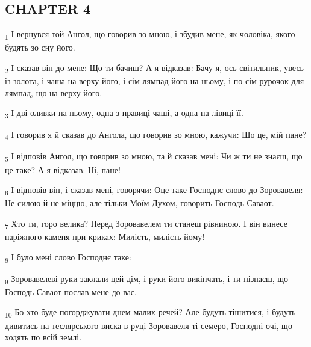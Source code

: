 \subsection{CHAPTER 4}
\begin{tcolorbox}
\textsubscript{1} І вернувся той Ангол, що говорив зо мною, і збудив мене, як чоловіка, якого будять зо сну його.
\end{tcolorbox}
\begin{tcolorbox}
\textsubscript{2} І сказав він до мене: Що ти бачиш? А я відказав: Бачу я, ось світильник, увесь із золота, і чаша на верху його, і сім лямпад його на ньому, і по сім рурочок для лямпад, що на верху його.
\end{tcolorbox}
\begin{tcolorbox}
\textsubscript{3} І дві оливки на ньому, одна з правиці чаші, а одна на лівиці її.
\end{tcolorbox}
\begin{tcolorbox}
\textsubscript{4} І говорив я й сказав до Ангола, що говорив зо мною, кажучи: Що це, мій пане?
\end{tcolorbox}
\begin{tcolorbox}
\textsubscript{5} І відповів Ангол, що говорив зо мною, та й сказав мені: Чи ж ти не знаєш, що це таке? А я відказав: Ні, пане!
\end{tcolorbox}
\begin{tcolorbox}
\textsubscript{6} І відповів він, і сказав мені, говорячи: Оце таке Господнє слово до Зоровавеля: Не силою й не міццю, але тільки Моїм Духом, говорить Господь Саваот.
\end{tcolorbox}
\begin{tcolorbox}
\textsubscript{7} Хто ти, горо велика? Перед Зоровавелем ти станеш рівниною. І він винесе наріжного каменя при криках: Милість, милість йому!
\end{tcolorbox}
\begin{tcolorbox}
\textsubscript{8} І було мені слово Господнє таке:
\end{tcolorbox}
\begin{tcolorbox}
\textsubscript{9} Зоровавелеві руки заклали цей дім, і руки його викінчать, і ти пізнаєш, що Господь Саваот послав мене до вас.
\end{tcolorbox}
\begin{tcolorbox}
\textsubscript{10} Бо хто буде погорджувати днем малих речей? Але будуть тішитися, і будуть дивитись на теслярського виска в руці Зоровавеля ті семеро, Господні очі, що ходять по всій землі.
\end{tcolorbox}
